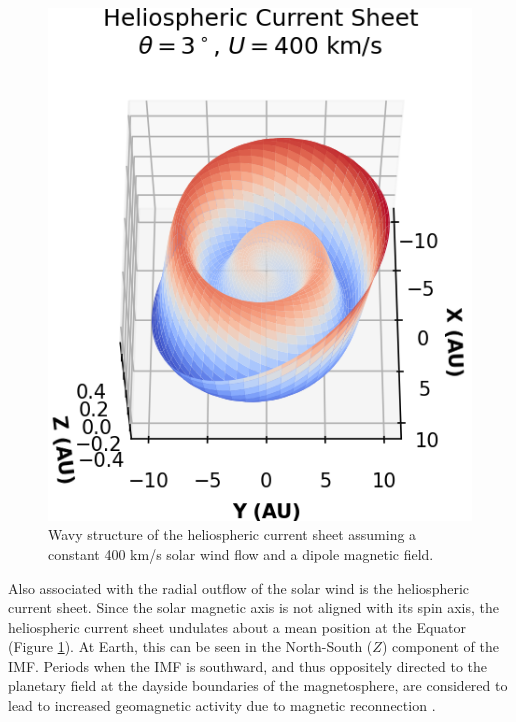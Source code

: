\begin{figure}
    \centering
    \includegraphics{images1/heliospheric-currentsheet.png}
    \caption{Wavy structure of the heliospheric current sheet assuming a constant 400 km/s solar wind flow and a dipole magnetic field.}
    \label{fig:heliospheric-current-sheet}
\end{figure}

Also associated with the radial outflow of the solar wind is the heliospheric current sheet. Since the solar magnetic axis is not aligned with its spin axis, the heliospheric current sheet undulates about a mean position at the Equator (Figure \ref{fig:heliospheric-current-sheet}). At Earth, this can be seen in the North-South ($Z$) component of the IMF. Periods when the IMF is southward, and thus oppositely directed to the planetary field at the dayside boundaries of the magnetosphere, are considered to lead to increased geomagnetic activity due to magnetic reconnection \cite{Boudouridis2005EnhancedOrientation}. 

